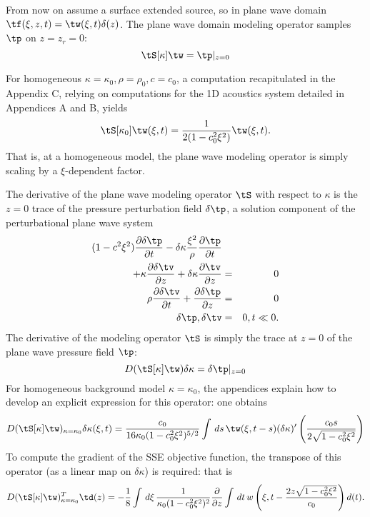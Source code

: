 From now on assume a surface extended source, so in plane wave domain
$\tf(\xi,z,t) = \tw(\xi,t)\delta(z)$. The plane wave domain modeling
operator samples $\tp$ on $z=z_r=0$:
\begin{equation}
\label{eqn:modpw}
\tS[\kappa]\tw = \tp|_{z=0}
\end{equation}

For homogeneous $\kappa=\kappa_0, \rho=\rho_0, c=c_0$, a computation
recapitulated in the Appendix C, relying on computations for the 1D
acoustics system detailed in Appendices A and B, yields
\begin{equation}
\label{eqn:modhom}
\tS[\kappa_0]\tw(\xi,t) = \frac{1}{2(1-c_0^2\xi^2)}\tw(\xi,t).
\end{equation}
That is, at a homogeneous model, the plane wave modeling operator is
simply scaling by a $\xi$-dependent factor.

The derivative of the plane wave modeling operator $\tS$ with respect
to $\kappa$ is the $z=0$ trace of the pressure perturbation field
$\delta \tp$, a solution component of the perturbational plane wave
system
\begin{eqnarray}
\label{eqn:dawepw}
(1-c^2\xi^2)\frac{\partial \delta \tp}{\partial t} -
  \delta \kappa \frac{\xi^2}{\rho}\frac{\partial \tp}{\partial t}
  \nonumber\\
+\kappa\frac{\partial
  \delta \tv}{\partial z} + \delta \kappa\frac{\partial
  \tv}{\partial z} &=& 0 \nonumber\\
\rho \frac{\partial \delta \tv}{\partial t} + \frac{\partial \delta \tp}{\partial
  z}&=&0\nonumber\\
\delta \tp,\delta \tv&=&0, t \ll 0.
\end{eqnarray}
The derivative of the modeling operator $\tS$ is simply the trace at
$z=0$ of the plane wave pressure field $\tp$:
\begin{equation}
\label{eqn:dmodpw}
D(\tS[\kappa]\tw)\delta \kappa = \delta \tp|_{z=0}
\end{equation}
For homogeneous background model $\kappa=\kappa_0$, the appendices
explain how to develop an explicit expression for this operator: one
obtains
\begin{equation}
\label{eqn:dmodhom}
D(\tS[\kappa]\tw)_{\kappa=\kappa_0}\delta \kappa(\xi,t) =
\frac{c_0}{16\kappa_0 (1-c_0^2\xi^2)^{5/2}}\int \,ds\,\tw(\xi,t-s)(\delta \kappa)'  \left(\frac{c_0
      s}{2\sqrt{1-c_0^2\xi^2}}\right)
\end{equation}
To compute the gradient of the SSE objective function, the transpose
of this operator (as a linear map on $\delta \kappa$) is required:
that is
\begin{equation}
\label{eqn:dmodhomadj}
D(\tS[\kappa]\tw)_{\kappa=\kappa_0}^T\td(z) =
- 
\frac{1}{8} \int \,d\xi\,\frac{1}{\kappa_0 (1-c_0^2\xi^2)^2}\frac{\partial}{\partial z} \int \,dt\,
  w\left(\xi,t-\frac{2z\sqrt{1-c_0^2\xi^2}}{c_0}\right)d(t).
\end{equation}

